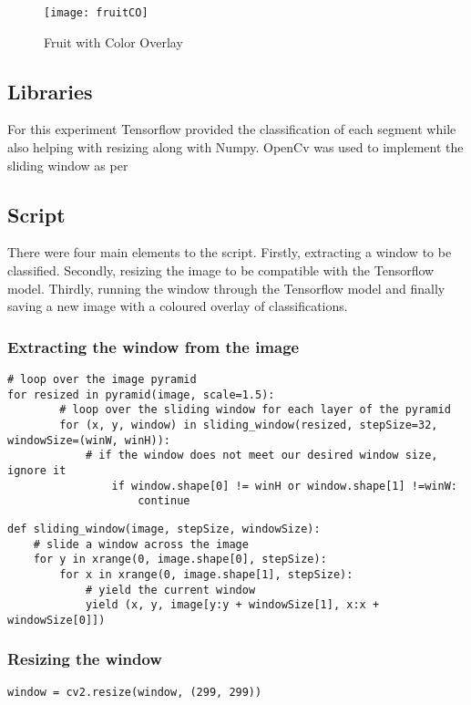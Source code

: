 \begin{figure}
    \texttt{[image: fruitCO]}
    \caption{Fruit with Color Overlay}
    \label{fig:fruitOverlay}
\end{figure}

\subsection*{Libraries}
For this experiment Tensorflow provided the classification of each segment while
also helping with resizing along with Numpy. OpenCv was used to implement the
sliding window as per \textcite{slidingWindowTut}

\subsection*{Script}
There were four main elements to the script. Firstly, extracting a window to be
classified. Secondly, resizing the image to be compatible with the Tensorflow
model. Thirdly, running the window through the Tensorflow model and finally
saving a new image with a coloured overlay of classifications.

\subsubsection*{Extracting the window from the image}
\begin{lstlisting}
# loop over the image pyramid
for resized in pyramid(image, scale=1.5):
		# loop over the sliding window for each layer of the pyramid
		for (x, y, window) in sliding_window(resized, stepSize=32, windowSize=(winW, winH)):
			# if the window does not meet our desired window size, ignore it
				if window.shape[0] != winH or window.shape[1] !=winW:
					continue
\end{lstlisting}


\begin{lstlisting}
def sliding_window(image, stepSize, windowSize):
	# slide a window across the image
	for y in xrange(0, image.shape[0], stepSize):
		for x in xrange(0, image.shape[1], stepSize):
			# yield the current window
			yield (x, y, image[y:y + windowSize[1], x:x + windowSize[0]])
\end{lstlisting}

\subsubsection*{Resizing the window}
\begin{lstlisting}
window = cv2.resize(window, (299, 299))
\end{lstlisting}

